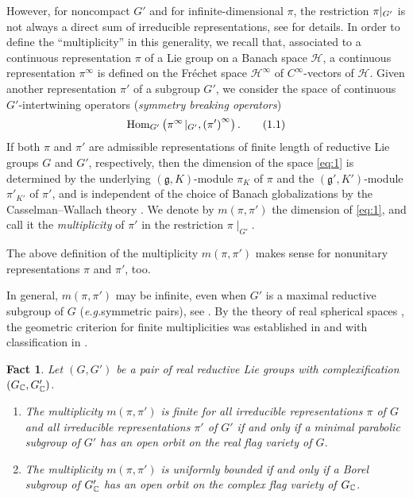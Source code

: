 \documentclass[reqno,12pt]{pja00} %
\newcommand{\Hom}{\mbox{\normalfont Hom}}
\newtheorem{fact}[theorem]{Fact}
\theoremstyle{definition}
\theoremstyle{exampstyle} \newtheorem{examp}[theorem]{Theorem}
\begin{document}
However, 
for noncompact $G'$ and for infinite-dimensional $\pi$,
the restriction $\pi\kern-0.1cm\mid_{G'}$
is not always a direct sum of irreducible representations, see \cite{kobayashi1998discrete3} for details.
In order to define the ``multiplicity'' in this generality, we recall that, associated to a continuous representation $\pi$ of a Lie group on a Banach space $\mathcal{H}$, 
a continuous representation $\pi^\infty$ is defined on the Fr\'echet space $\mathcal{H}^\infty$ of $C^\infty$-vectors of $\mathcal{H}$.
Given another representation $\pi'$ of a subgroup $G'$, we consider the space of continuous $G'$-intertwining operators ({\it symmetry breaking operators})
\begin{equation}\label{eq:1}
	\Hom_{G'}\left( \pi^\infty\!\mid_{G'}, \left( \pi' \right)^\infty\right).\tag{1.1}
\end{equation}
If both $\pi$ and $\pi'$ are admissible representations of finite length of reductive Lie groups $G$ and $G'$, respectively, then the dimension of the space \eqref{eq:1} is determined by the underlying
$(\mathfrak{g},K)$-module $\pi_K$ of $\pi$ and the $(\mathfrak{g}',K')$-module $\pi'_{K'}$ of $\pi'$, and is independent of the choice of Banach globalizations by the 
Casselman--Wallach theory
\cite[Chap.\ 11]{wallach1988real2}. We denote by $m(\pi,\pi')$ the dimension of \eqref{eq:1}, and call it the {\it multiplicity} of $\pi'$ in the restriction $\pi\!\mid_{G'}$.

The above definition of the multiplicity $m(\pi,\pi')$ makes sense for nonunitary representations $\pi$ and $\pi'$, too. 

In general, $m(\pi,\pi')$ may be infinite, even when $G'$ is a 
maximal reductive subgroup of $G$
({\it e.g.}\;symmetric pairs), see \cite{Kobayashi2014}.
By the theory of real spherical spaces \cite{kobayashi2013finite}, the geometric criterion for finite multiplicities was established in \cite{Kobayashi2014} and \cite{kobayashi2013finite} with classification in \cite{kobayashi2014classification}.
\begin{fact}\label{fact:1} Let $(G,G')$ be a pair of real reductive Lie groups with complexification $(G_{\mathbb{C}},G'_{\mathbb{C}})$.
	\begin{enumerate}[(1)]
		\item The multiplicity $m(\pi,\pi')$ is finite for all irreducible representations $\pi$ of $G$ and all irreducible representations $\pi'$ of $G'$ if and only if
			a minimal parabolic subgroup of $G'$ has an open orbit on the real flag variety of $G$.
		\item The multiplicity $m(\pi,\pi')$ is uniformly bounded if and only if a Borel subgroup of $G_{\mathbb{C}}'$ has an open orbit on the complex flag variety of $G_{\mathbb{C}}$.
	\end{enumerate}
\end{fact}
\end{document}
